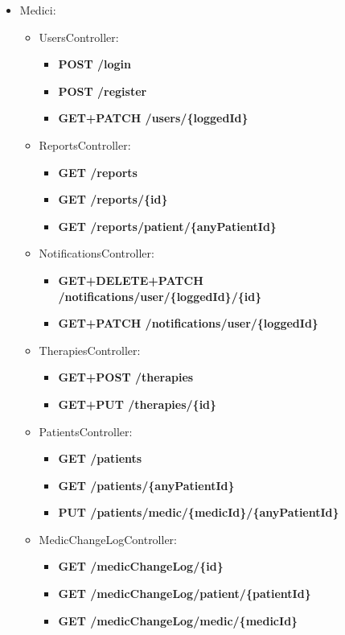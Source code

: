 \documentclass[a4paper]{article}
\begin{document}
\begin{itemize}
  \item Medici:
  \begin{itemize}
    \item UsersController:
    \begin{itemize}
      \item \textbf{POST /login}
      \item \textbf{POST /register}
      \item \textbf{GET+PATCH /users/\{loggedId\}} 
    \end{itemize}
    \item ReportsController:
    \begin{itemize}
      \item \textbf{GET /reports}
      \item \textbf{GET /reports/\{id\}}
      \item \textbf{GET /reports/patient/\{anyPatientId\}}
    \end{itemize}
    \item NotificationsController:
    \begin{itemize}
      \item \textbf{GET+DELETE+PATCH /notifications/user/\{loggedId\}/\{id\}}
      \item \textbf{GET+PATCH /notifications/user/\{loggedId\}}
    \end{itemize}
    \item TherapiesController:
    \begin{itemize}
      \item \textbf{GET+POST /therapies}
      \item \textbf{GET+PUT /therapies/\{id\}}
    \end{itemize}
    \item PatientsController:
    \begin{itemize}
      \item \textbf{GET /patients}
      \item \textbf{GET /patients/\{anyPatientId\}}
      \item \textbf{PUT /patients/medic/\{medicId\}/\{anyPatientId\}}
    \end{itemize}
    \item MedicChangeLogController:
    \begin{itemize}
      \item \textbf{GET /medicChangeLog/\{id\}}
      \item \textbf{GET /medicChangeLog/patient/\{patientId\}}
      \item \textbf{GET /medicChangeLog/medic/\{medicId\}}
    \end{itemize}
  \end{itemize}
\end{itemize}
\end{document}
